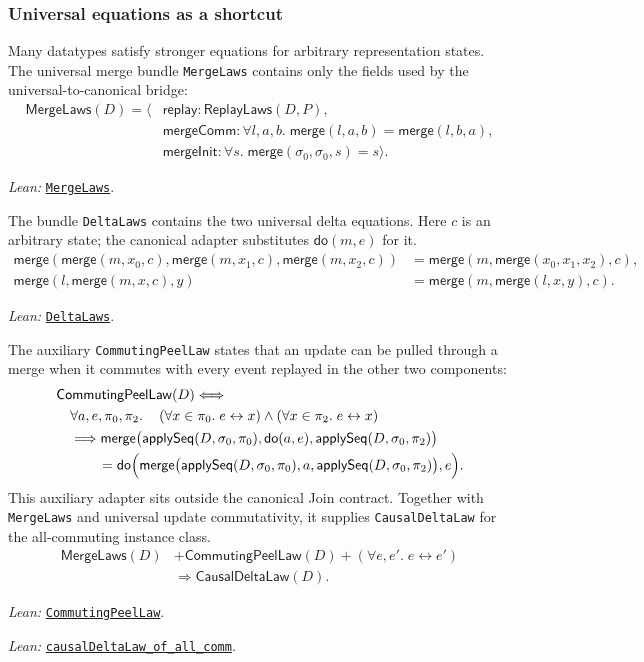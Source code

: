 \documentclass[11pt]{article}
\theoremstyle{definition}
\newcommand{\init}{\sigma_0}
\newcommand{\applySeq}{\mathsf{applySeq}}
\newcommand{\doop}{\mathsf{do}}
\newcommand{\merge}{\mathsf{merge}}
\newcommand{\lean}[1]{\texttt{#1}}
\newcommand{\src}[2]{\href{../../#1}{\texttt{#2}}}
\newcommand{\anchor}[2]{\par\smallskip\noindent\emph{Lean: }\src{#1}{#2}.}
\begin{document}
\subsubsection{Universal equations as a shortcut}

Many datatypes satisfy stronger equations for arbitrary representation
states. The universal merge bundle \lean{MergeLaws} contains only the fields
used by the universal-to-canonical bridge:
\[
\begin{aligned}
 \mathsf{MergeLaws}(D)=\langle
 &\mathsf{replay}:\mathsf{ReplayLaws}(D,P),\\
 &\mathsf{mergeComm}:\forall l,a,b.\;
   \merge(l,a,b)=\merge(l,b,a),\\
 &\mathsf{mergeInit}:\forall s.\;
   \merge(\init,\init,s)=s\rangle.
\end{aligned}
\]
\anchor{Sal/MRDTs/Framework/MergeLaws.lean}{MergeLaws}

The bundle \lean{DeltaLaws} contains the two universal delta equations. Here
$c$ is an arbitrary state; the canonical adapter substitutes
$\doop(m,e)$ for it.
\[
\begin{aligned}
 \merge(\merge(m,x_0,c),\merge(m,x_1,c),\merge(m,x_2,c))
   &=\merge(m,\merge(x_0,x_1,x_2),c),\\
 \merge(l,\merge(m,x,c),y)&=\merge(m,\merge(l,x,y),c).
\end{aligned}
\]
\anchor{Sal/MRDTs/Framework/MergeLaws.lean}{DeltaLaws}

The auxiliary \lean{CommutingPeelLaw} states that an update can be pulled
through a merge when it commutes with every event replayed in the other two
components:
\[
\begin{aligned}
 &\mathsf{CommutingPeelLaw}(D)\Longleftrightarrow\\
 &\quad\forall a,e,\pi_0,\pi_2.\quad
 \left(\forall x\in\pi_0.\;e\leftrightarrow x\right)
 \land\left(\forall x\in\pi_2.\;e\leftrightarrow x\right)\\
 &\quad\Longrightarrow
 \merge\bigl(\applySeq(D,\init,\pi_0),\doop(a,e),
                   \applySeq(D,\init,\pi_2)\bigr)\\
 &\qquad\quad=
 \doop\Bigl(\merge\bigl(\applySeq(D,\init,\pi_0),a,
                         \applySeq(D,\init,\pi_2)\bigr),e\Bigr).
\end{aligned}
\]
This auxiliary adapter sits outside the canonical Join contract. Together
with \lean{MergeLaws} and universal update commutativity, it supplies
\lean{CausalDeltaLaw} for the all-commuting instance class.
\[
\begin{aligned}
 \mathsf{MergeLaws}(D)&+\mathsf{CommutingPeelLaw}(D)
 +(\forall e,e'.\;e\leftrightarrow e')\\
 &\Longrightarrow\mathsf{CausalDeltaLaw}(D).
\end{aligned}
\]
\anchor{Sal/MRDTs/Framework/MergeLaws.lean}{CommutingPeelLaw}
\anchor{Sal/MRDTs/Metatheory/Adequacy.lean}
  {causalDeltaLaw\_of\_all\_comm}
\end{document}
